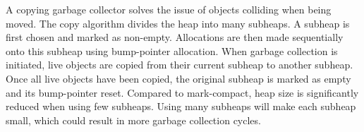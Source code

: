A copying garbage collector solves the issue of objects colliding when being moved. The copy algorithm divides the heap into many subheaps. A subheap is first chosen and marked as non-empty. Allocations are then made sequentially onto this subheap using bump-pointer allocation. When garbage collection is initiated, live objects are copied from their current subheap to another subheap. Once all live objects have been copied, the original subheap is marked as empty and its bump-pointer reset. Compared to mark-compact, heap size is significantly reduced when using few subheaps. Using many subheaps will make each subheap small, which could result in more garbage collection cycles.

